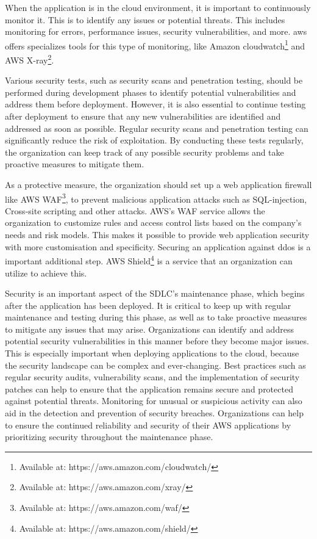When the application is in the cloud environment, it is important to continuously monitor it. This is to identify any issues or potential threats. This includes monitoring for errors, performance issues, security vulnerabilities, and more. \acrshort{aws} offers specializes tools for this type of monitoring, like Amazon cloudwatch\footnote{Available at: https://aws.amazon.com/cloudwatch/} and AWS X-ray\footnote{Available at: https://aws.amazon.com/xray/}. 

Various security tests, such as security scans and penetration testing, should be performed during development phases to identify potential vulnerabilities and address them before deployment. However, it is also essential to continue testing after deployment to ensure that any new vulnerabilities are identified and addressed as soon as possible. Regular security scans and penetration testing can significantly reduce the risk of exploitation. By conducting these tests regularly, the organization can keep track of any possible security problems and take proactive measures to mitigate them.

As a protective measure, the organization should set up a web application firewall like AWS WAF\footnote{Available at: https://aws.amazon.com/waf/}, to prevent malicious application attacks such as \gls{SQL-injection}, \gls{Cross-site scripting} and other attacks. AWS's WAF service allows the organization to customize rules and access control lists based on the company's needs and risk models. This makes it possible to provide web application security with more customisation and specificity. Securing an application against \gls{ddos} is a important additional step. AWS Shield\footnote{Available at: https://aws.amazon.com/shield/} is a service that an organization can utilize to achieve this. \cite{awsafterdep}

Security is an important aspect of the SDLC's maintenance phase, which begins after the application has been deployed. It is critical to keep up with regular maintenance and testing during this phase, as well as to take proactive measures to mitigate any issues that may arise. Organizations can identify and address potential security vulnerabilities in this manner before they become major issues. This is especially important when deploying applications to the cloud, because the security landscape can be complex and ever-changing. Best practices such as regular security audits, vulnerability scans, and the implementation of security patches can help to ensure that the application remains secure and protected against potential threats. Monitoring for unusual or suspicious activity can also aid in the detection and prevention of security breaches. Organizations can help to ensure the continued reliability and security of their AWS applications by prioritizing security throughout the maintenance phase.

